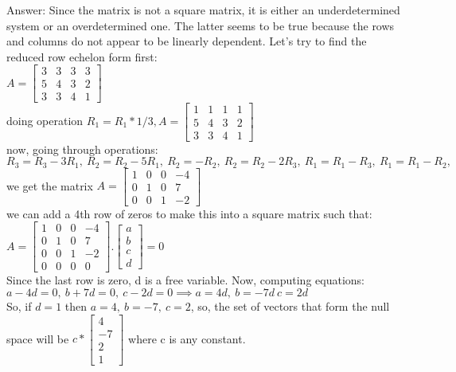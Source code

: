 \documentclass{article}%
\begin{document}
\begin{enumerate}
    Answer: Since the matrix is not a square matrix, it is either an underdetermined system or an overdetermined one. The latter seems to be true because the rows and columns do not appear to be linearly dependent. 
    Let's try to find the reduced row echelon form first: \\

    $A = \begin{bmatrix} 3 & 3 & 3 & 3 \\ 5 & 4 & 3 & 2 \\ 3 & 3 & 4 & 1 \end{bmatrix}$ \\
    doing operation $R_1 = R_1 * 1/3, A = \begin{bmatrix} 1 & 1 & 1 & 1 \\ 5 & 4 & 3 & 2 \\ 3 & 3 & 4 & 1 \end{bmatrix}$ \\
    now, going through operations: $R_3 = R_3 - 3R_1, \ R_2 = R_2 - 5R_1, \ R_2 = -R_2, \ R_2 = R_2 - 2R_3, \ R_1 = R_1 - R_3, \ R_1 = R_1 - R_2, \ $ we get the matrix $A = \begin{bmatrix} 1 & 0 & 0 & -4 \\ 0 & 1 & 0 & 7 \\ 0 & 0 & 1 & -2 \end{bmatrix}$ \\
    we can add a 4th row of zeros to make this into a square matrix such that: $A = \begin{bmatrix} 1 & 0 & 0 & -4 \\ 0 & 1 & 0 & 7 \\ 0 & 0 & 1 & -2 \\ 0 & 0 & 0 & 0 \end{bmatrix} . \begin{bmatrix} a \\ b \\ c \\ d \end{bmatrix} = 0 $ \\
    Since the last row is zero, d is a free variable. Now, computing equations: \\
    $a - 4d = 0, \ b + 7d = 0, \ c - 2d = 0 \implies a = 4d, \ b = -7d \ c = 2d$ \\
    So, if $d = 1$ then $a = 4, \ b = -7, \ c = 2$, so, the set of vectors that form the null space will be $c * \begin{bmatrix} 4 \\ -7 \\ 2 \\ 1 \end{bmatrix}$ where c is any constant.
    

\end{enumerate}
\end{document}
